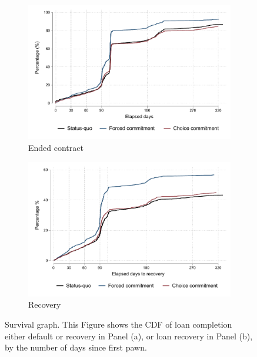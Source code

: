 \begin{appendix}
\begin{figure}[H]
    \begin{center}
   \begin{subfigure}{0.49\textwidth}
   \caption{Ended contract}
        \centering
        \includegraphics[width=\textwidth]{Figuras/survival_graph_ended.pdf}
    \end{subfigure} 
   \begin{subfigure}{0.49\textwidth}
   \caption{Recovery}
        \centering
        \includegraphics[width=\textwidth]{Figuras/survival_graph_unpledge.pdf}
    \end{subfigure}     
    \end{center}
      \caption{Survival graph. This Figure shows the CDF of loan completion either default or recovery in Panel (a), or loan recovery in Panel (b), by the number of days since first pawn.}
      \label{survival_graph}
\end{figure}


\end{appendix}
